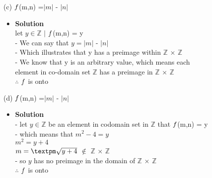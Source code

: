 \documentclass[11pt]{article}
\begin{document}
\begin{enumerate}

\begin{flushleft}
\end{flushleft}


\large (c) $\mathnormal{f}$(m,n) =$\lvert m  \rvert$ - $\lvert n \rvert$ \\

\begin{itemize}
\item \textbf{Solution}\\
\large let $y \in \mathbb{ Z }$ $\mid$ $\mathnormal{f}$(m,n) = y\\
\large - We can say that $y = \lvert m  \rvert$ - $\lvert n \rvert$\\
\large - Which illustrates that y has a preimage within $\mathbb{Z}$ × $\mathbb{Z}$\\
\large - We know that y is an arbitrary value, which means each\\ element in co-domain set $\mathbb{ Z}$ has a preimage in
$\mathbb{Z}$ × $\mathbb{Z}$\\
\large $\therefore$ $\mathnormal{f}$ is onto\\


\end {itemize}
\end {enumerate}


\pagebreak



\begin{enumerate}

\begin{flushleft}
\end{flushleft}


\large (d) $\mathnormal{f}$(m,n) =$\lvert m  \rvert$ - $\lvert n \rvert$ \\

\begin{itemize}
\item \textbf{Solution}\\
\large - let $y \in \mathbb{ Z }$ be an element in codomain set in  $\mathbb{Z}$ \mind that $\mathnormal{f}$(m,n) = y\\
\large - which means that $m^2 - 4 = y$\\
\large $m^2 = y + 4$\\
\large $m = \textpm \sqrt{y+4}$ $\notin$ $\mathbb{Z}$ × $\mathbb{Z}$\\
\large - so $y$ has no preimage in the domain of $\mathbb{Z}$ × $\mathbb{Z}$\\
\large $\therefore$ $\mathnormal{f}$ is onto\\


\end {itemize}
\end {enumerate}
\end{document}
